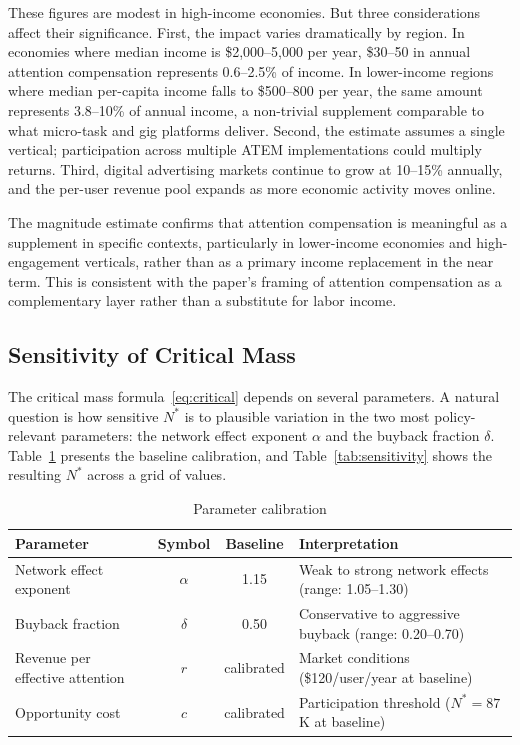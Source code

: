 \documentclass[12pt, a4paper]{article}
\begin{document}
These figures are modest in high-income economies. But three considerations affect their significance. First, the impact varies dramatically by region. In economies where median income is \$2,000--5,000 per year, \$30--50 in annual attention compensation represents 0.6--2.5\% of income. In lower-income regions where median per-capita income falls to \$500--800 per year, the same amount represents 3.8--10\% of annual income, a non-trivial supplement comparable to what micro-task and gig platforms deliver. Second, the estimate assumes a single vertical; participation across multiple ATEM implementations could multiply returns. Third, digital advertising markets continue to grow at 10--15\% annually, and the per-user revenue pool expands as more economic activity moves online.

The magnitude estimate confirms that attention compensation is meaningful as a supplement in specific contexts, particularly in lower-income economies and high-engagement verticals, rather than as a primary income replacement in the near term. This is consistent with the paper's framing of attention compensation as a complementary layer rather than a substitute for labor income.

\subsection{Sensitivity of Critical Mass}
\label{sec:model-sensitivity}

The critical mass formula~\eqref{eq:critical} depends on several parameters. A natural question is how sensitive $N^*$ is to plausible variation in the two most policy-relevant parameters: the network effect exponent $\alpha$ and the buyback fraction $\delta$. Table~\ref{tab:calibration} presents the baseline calibration, and Table~\ref{tab:sensitivity} shows the resulting $N^*$ across a grid of values.

\begin{table}[H]
\centering
\caption{Parameter calibration}
\label{tab:calibration}
\begin{tabularx}{\textwidth}{lccX}
\toprule
\textbf{Parameter} & \textbf{Symbol} & \textbf{Baseline} & \textbf{Interpretation} \\
\midrule
Network effect exponent & $\alpha$ & 1.15 & Weak to strong network effects (range: 1.05--1.30) \\
Buyback fraction & $\delta$ & 0.50 & Conservative to aggressive buyback (range: 0.20--0.70) \\
Revenue per effective attention & $r$ & calibrated & Market conditions (\$120/user/year at baseline) \\
Opportunity cost & $c$ & calibrated & Participation threshold ($N^* = 87$K at baseline) \\
\bottomrule
\end{tabularx}
\end{table}
\end{document}
